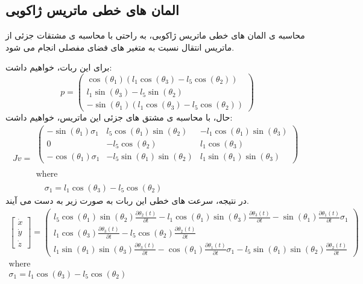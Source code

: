 \subsection*{المان های خطی ماتریس ژاکوبی}
محاسبه ی المان های خطی ماتریس ژاکوبی، به راحتی با محاسبه ی مشتقات جزئی از ماتریس انتقال نسبت به متغیر های فضای مفصلی انجام می شود. 

برای این ربات، خواهیم داشت:
\[
p = 
\begin{pmatrix}
	\cos\left(\theta_1\right)\left(l_1\cos\left(\theta_3\right) - l_5\cos\left(\theta_2\right)\right) \\
	l_1\sin\left(\theta_3\right) - l_5\sin\left(\theta_2\right) \\
	-\sin\left(\theta_1\right)\left(l_1\cos\left(\theta_3\right) - l_5\cos\left(\theta_2\right)\right)
\end{pmatrix}
\]
حال، با محاسبه ی مشتق های جزئی این ماتریس، خواهیم داشت:
\[
Jv =
\begin{array}{l}
	\begin{pmatrix}
		-\sin\left(\theta_1\right)\sigma_1 & l_5\cos\left(\theta_1\right)\sin\left(\theta_2\right) & -l_1\cos\left(\theta_1\right)\sin\left(\theta_3\right) \\
		0 & -l_5\cos\left(\theta_2\right) & l_1\cos\left(\theta_3\right) \\
		-\cos\left(\theta_1\right)\sigma_1 & -l_5\sin\left(\theta_1\right)\sin\left(\theta_2\right) & l_1\sin\left(\theta_1\right)\sin\left(\theta_3\right)
	\end{pmatrix} \\
	\\
	\text{where} \\
	\\
	\quad \sigma_1 = l_1\cos\left(\theta_3\right) - l_5\cos\left(\theta_2\right)
\end{array}
\]
در نتیجه، سرعت های خطی این ربات به صورت زیر به دست می آیند.
\[
\begin{aligned}
	\begin{bmatrix}
		\dot{x} \\
		\dot{y} \\
		\dot{z}
	\end{bmatrix} =
	\begin{pmatrix}
		l_5 \cos\left(\theta_1\right) \sin\left(\theta_2\right) \frac{\partial \theta_2(t)}{\partial t}
		- l_1 \cos\left(\theta_1\right) \sin\left(\theta_3\right) \frac{\partial \theta_3(t)}{\partial t} 
		- \sin\left(\theta_1\right) \frac{\partial \theta_1(t)}{\partial t} \sigma_1 \\
		l_1 \cos\left(\theta_3\right) \frac{\partial \theta_3(t)}{\partial t} 
		- l_5 \cos\left(\theta_2\right) \frac{\partial \theta_2(t)}{\partial t} \\
		l_1 \sin\left(\theta_1\right) \sin\left(\theta_3\right) \frac{\partial \theta_3(t)}{\partial t} 
		- \cos\left(\theta_1\right) \frac{\partial \theta_1(t)}{\partial t} \sigma_1 
		- l_5 \sin\left(\theta_1\right) \sin\left(\theta_2\right) \frac{\partial \theta_2(t)}{\partial t}
	\end{pmatrix} \\
	\text{where} \\
	\sigma_1 = l_1 \cos\left(\theta_3\right) - l_5 \cos\left(\theta_2\right)
\end{aligned}
\]
